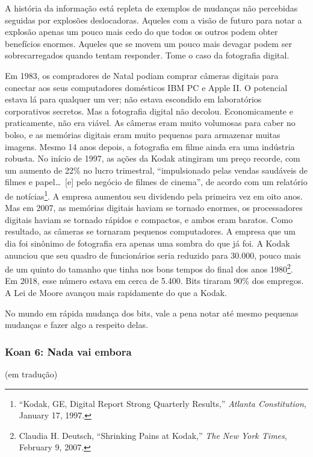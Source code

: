 A história da informação está repleta de exemplos de mudanças não percebidas 
seguidas por explosões deslocadoras. Aqueles com a visão de futuro para notar a 
explosão apenas um pouco mais cedo do que todos os outros podem obter benefícios 
enormes. Aqueles que se movem um pouco mais devagar podem ser sobrecarregados 
quando tentam responder. Tome o caso da fotografia digital.

Em 1983, os compradores de Natal podiam comprar câmeras digitais para conectar 
aos seus computadores domésticos IBM PC e Apple II. O potencial estava lá para 
qualquer um ver; não estava escondido em laboratórios corporativos secretos. Mas 
a fotografia digital não decolou. Economicamente e praticamente, não era viável.
As câmeras eram muito volumosas para caber no bolso, e as memórias digitais eram
muito pequenas para armazenar muitas imagens. Mesmo 14 anos depois, a fotografia
em filme ainda era uma indústria robusta. No início de 1997, as ações da Kodak
atingiram um preço recorde, com um aumento de 22\% no lucro trimestral, 
``impulsionado pelas vendas saudáveis de filmes e papel\ldots\ [e] pelo negócio
de filmes de cinema'', de acordo com um relatório de notícias\footnote{``Kodak,
GE, Digital Report Strong Quarterly Results,'' \textit{Atlanta Constitution},
January 17, 1997.}. A empresa aumentou seu dividendo pela primeira vez em oito
anos. Mas em 2007, as memórias digitais haviam se tornado enormes, os 
processadores digitais haviam se tornado rápidos e compactos, e ambos eram 
baratos. Como resultado, as câmeras se tornaram pequenos computadores. A empresa 
que um dia foi sinônimo de fotografia era apenas uma sombra do que já foi. A 
Kodak anunciou que seu quadro de funcionários seria reduzido para 30.000, pouco 
mais de um quinto do tamanho que tinha nos bons tempos do final dos anos
1980\footnote{Claudia H. Deutsch, ``Shrinking Pains at Kodak,'' \textit{The New
York Times}, February 9, 2007.}. Em 2018, esse número estava em cerca de 5.400.
Bits tiraram 90\% dos empregos. A Lei de Moore avançou mais rapidamente do que a
Kodak.

No mundo em rápida mudança dos bits, vale a pena notar até mesmo pequenas
mudanças e fazer algo a respeito delas.


\subsubsection*{Koan 6: Nada vai embora}
(em tradução)
